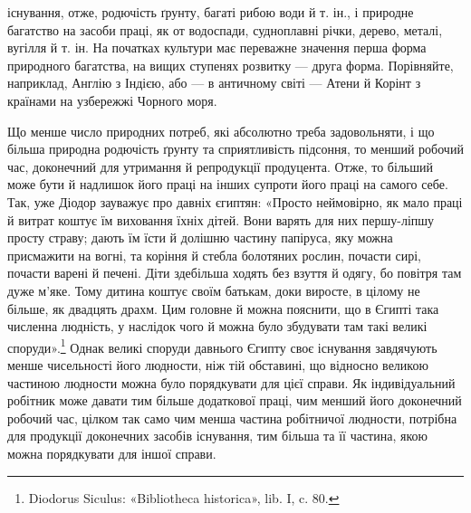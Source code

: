\parcont{}  %
існування, отже, родючість ґрунту, багаті рибою води й т. ін.,
і природне багатство на засоби праці, як от водоспади, судноплавні
річки, дерево, металі, вугілля й т. ін. На початках культури
має переважне значення перша форма природного багатства,
на вищих ступенях розвитку — друга форма. Порівняйте,
наприклад, Англію з Індією, або — в античному світі — Атени
й Корінт з країнами на узбережжі Чорного моря.

Що менше число природних потреб, які абсолютно треба
задовольняти, і що більша природна родючість ґрунту та сприятливість
підсоння, то менший робочий час, доконечний для утримання
й репродукції продуцента. Отже, то більший може бути й
надлишок його праці на інших супроти його праці на самого себе.
Так, уже Діодор зауважує про давніх єгиптян: «Просто неймовірно,
як мало праці й витрат коштує їм виховання їхніх дітей.
Вони варять для них першу-ліпшу просту страву; дають їм
їсти й долішню частину папіруса, яку можна присмажити на
вогні, та коріння й стебла болотяних рослин, почасти сирі, почасти
варені й печені. Діти здебільша ходять без взуття й одягу,
бо повітря там дуже м’яке. Тому дитина коштує своїм батькам,
доки виросте, в цілому не більше, як двадцять драхм. Цим головне
й можна пояснити, що в Єгипті така численна людність,
у наслідок чого й можна було збудувати там такі великі споруди».\footnote{
Diodorus Siculus: «Bibliotheca historica», lib. I, c. 80.
}
Однак великі споруди давнього Єгипту своє існування
завдячують менше чисельності його людности, ніж тій обставині,
що відносно великою частиною людности можна було порядкувати
для цієї справи. Як індивідуальний робітник може давати
тим більше додаткової праці, чим менший його доконечний робочий
час, цілком так само чим менша частина робітничої людности,
потрібна для продукції доконечних засобів існування,
тим більша та її частина, якою можна порядкувати для іншої
справи.

